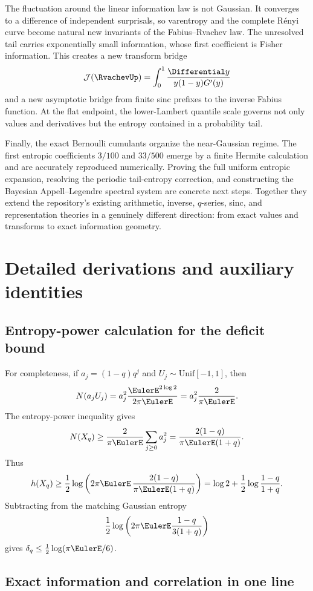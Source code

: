 \documentclass[11pt,oneside]{article}
\theoremstyle{definition}
\theoremstyle{remark}
\begin{document}
The fluctuation around the linear information law is not Gaussian.  It converges
to a difference of independent surprisals, so varentropy and the complete R\'enyi
curve become natural new invariants of the Fabius--Rvachev law.  The unresolved
tail carries exponentially small information, whose first coefficient is Fisher
information.  This creates a new transform bridge
\[
 \mathcal J(\RvachevUp)
 =\int_0^1\frac{\Differential y}{y(1-y)G'(y)}
\]
and a new asymptotic bridge from finite sinc prefixes to the inverse Fabius
function.  At the flat endpoint, the lower-Lambert quantile scale governs not only
values and derivatives but the entropy contained in a probability tail.

Finally, the exact Bernoulli cumulants organize the near-Gaussian regime.  The
first entropic coefficients $3/100$ and $33/500$ emerge by a finite Hermite
calculation and are accurately reproduced numerically.  Proving the full uniform
entropic expansion, resolving the periodic tail-entropy correction, and
constructing the Bayesian Appell--Legendre spectral system are concrete next
steps.  Together they extend the repository's existing arithmetic, inverse,
$q$-series, sinc, and representation theories in a genuinely different direction:
from exact values and transforms to exact information geometry.

\appendix

\section{Detailed derivations and auxiliary identities}
\label{app:derivations}

\subsection{Entropy-power calculation for the deficit bound}

For completeness, if $a_j=(1-q)q^j$ and $U_j\sim\mathrm{Unif}[-1,1]$, then
\[
 N(a_jU_j)=a_j^2\frac{\EulerE^{2\log2}}{2\pi\EulerE}
 =a_j^2\frac{2}{\pi\EulerE}.
\]
The entropy-power inequality gives
\[
 N(X_q)\ge\frac{2}{\pi\EulerE}\sum_{j\ge0}a_j^2
 =\frac{2(1-q)}{\pi\EulerE(1+q)}.
\]
Thus
\[
 h(X_q)\ge\frac12\log\left(2\pi\EulerE\,
 \frac{2(1-q)}{\pi\EulerE(1+q)}\right)
 =\log2+\frac12\log\frac{1-q}{1+q}.
\]
Subtracting from the matching Gaussian entropy
\[
 \frac12\log\left(2\pi\EulerE\frac{1-q}{3(1+q)}\right)
\]
gives $\delta_q\le\tfrac12\log(\pi\EulerE/6)$.

\subsection{Exact information and correlation in one line}
\end{document}
